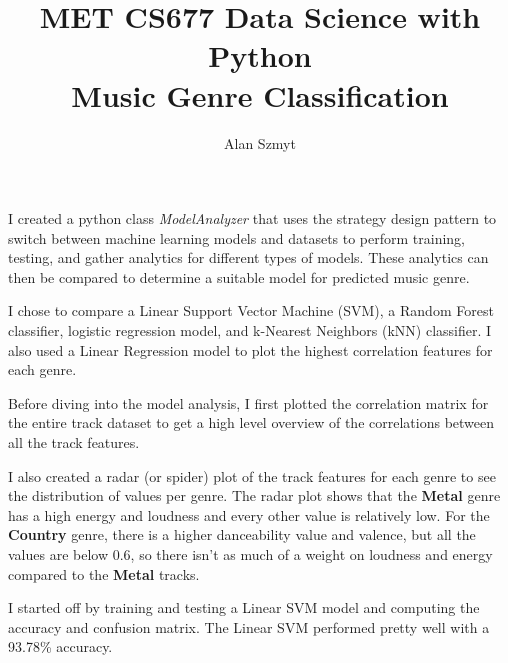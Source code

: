 \documentclass[12pt, a4paper]{extarticle}
\author{Alan Szmyt}
\title{MET CS677 Data Science with Python \\ Music Genre Classification }
\begin{document}
    \nocite{*}

    \maketitle

    \thispagestyle{firstpage}

    

    \pagestyle{pages}

    I created a python class \textit{ModelAnalyzer} that uses the strategy design pattern to
    switch between machine learning models and datasets to perform training, testing,
    and gather analytics for different types of models.
    These analytics can then be compared to determine a suitable model for predicted music genre.

    I chose to compare a Linear Support Vector Machine (SVM), a Random Forest
    classifier, logistic regression model, and k-Nearest Neighbors (kNN) classifier.
    I also used a Linear Regression model to plot the highest correlation features
    for each genre.


    Before diving into the model analysis, I first plotted the correlation matrix for
    the entire track dataset to get a high level overview of the correlations between
    all the track features.

    I also created a radar (or spider) plot of the track features for each genre to see
    the distribution of values per genre.
    The radar plot shows that the \textbf{Metal} genre has a high energy and loudness
    and every other value is relatively low.
    For the \textbf{Country} genre, there is a higher danceability value and valence,
    but all the values are below 0.6, so there isn't as much of a weight on loudness
    and energy compared to the \textbf{Metal} tracks.



    I started off by training and testing a Linear SVM model and computing the accuracy
    and confusion matrix.
    The Linear SVM performed pretty well with a 93.78\% accuracy.
\end{document}
